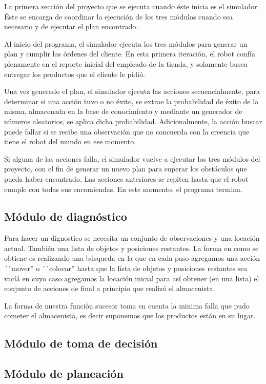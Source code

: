 \documentclass[11pt]{article}
\begin{document}
La primera sección del proyecto que se ejecuta cuando éste inicia es el simulador. Éste se encarga de coordinar la ejecución de los tres módulos cuando sea necesario y de ejecutar el plan encontrado.

Al inicio del programa, el simulador ejecuta los tres módulos para generar un plan y cumplir las órdenes del cliente. En esta primera iteración, el robot confía plenamente en el reporte inicial del empleado de la tienda, y solamente busca entregar los productos que el cliente le pidió.

Una vez generado el plan, el simulador ejecuta las acciones secuencialmente. para determinar si una acción tuvo o no éxito, se extrae la probabilidad de éxito de la misma, almacenada en la base de conocimiento y mediante un generador de números aleatorios, se aplica dicha probabilidad. Adicionalmente, la acción buscar puede fallar si se recibe una observación que no concuerda con la creencia que tiene el robot del mundo en ese momento.

Si alguna de las acciones falla, el simulador vuelve a ejecutar los tres módulos del proyecto, con el fin de generar un nuevo plan para superar los obstáculos que pueda haber encontrado. Las acciones anteriores se repiten hasta que el robot cumple con todas sus encomiendas. En este momento, el programa termina.

\subsection{Módulo de diagnóstico}

Para hacer un dignostico se necesita un conjunto de observaciones y una
locación actual. También una lista de objetos y posiciones restantes.
La forma en como se obtiene es realizando una búsqueda en la que en cada
paso agregamos una acción ´´mover'' o ´´colocar'' hasta que la lista de
objetos y posiciones restantes sea vacíá en cuyo caso agregamos la
locación inicial para así obtener (en una lista) el conjunto de acciones
de final a principio que realizó el almacenista.

La forma de nuestra función sucesor toma en cuenta la minima falla que pudo
cometer el almacenista, es decir suponemos que los productos están en su
lugar.

\subsection{Módulo de toma de decisión}

\subsection{Módulo de planeación}
\end{document}
